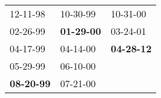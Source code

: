 \begin{supertabular}{p{0.33\columnwidth}p{0.33\columnwidth}p{0.33\columnwidth}}
          12-11-98\textsuperscript{} &           10-30-99\textsuperscript{} &           10-31-00\textsuperscript{} \\
          02-26-99\textsuperscript{} &  \textbf{01-29-00\textsuperscript{}} &           03-24-01\textsuperscript{} \\
          04-17-99\textsuperscript{} &           04-14-00\textsuperscript{} &  \textbf{04-28-12\textsuperscript{}} \\
          05-29-99\textsuperscript{} &           06-10-00\textsuperscript{} &                                      \\
 \textbf{08-20-99\textsuperscript{}} &           07-21-00\textsuperscript{} &                                      \\
\end{supertabular}
